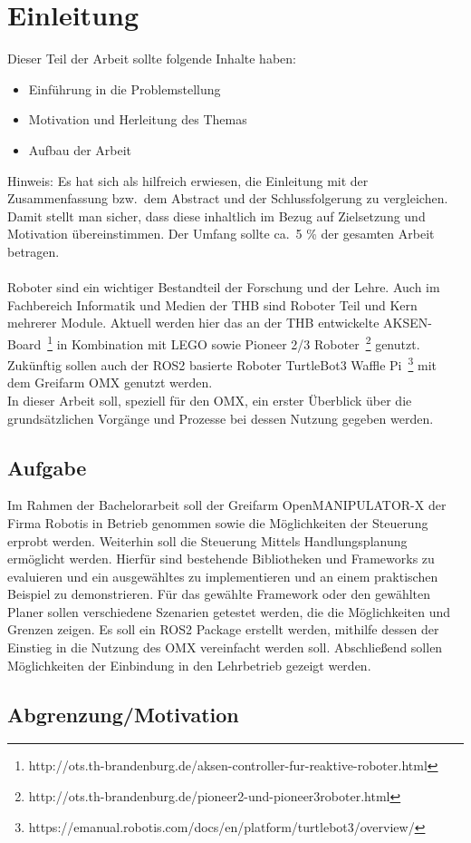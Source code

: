 \section{Einleitung} \label{einleitung}
Dieser Teil der Arbeit sollte folgende Inhalte haben:

\begin{itemize}
\item Einführung in die Problemstellung
\item Motivation und Herleitung des Themas
\item Aufbau der Arbeit
\end{itemize}

Hinweis:
Es hat sich als hilfreich erwiesen, die Einleitung mit der Zusammenfassung bzw.\ dem Abstract und der Schlussfolgerung zu vergleichen.
Damit stellt man sicher, dass diese inhaltlich im Bezug auf Zielsetzung und Motivation übereinstimmen.
Der Umfang sollte ca.\ 5 \% der gesamten Arbeit betragen.
\\
\\
Roboter sind ein wichtiger Bestandteil der Forschung und der Lehre.
Auch im Fachbereich Informatik und Medien der \ac{THB} sind Roboter Teil und Kern mehrerer Module.
Aktuell werden hier das an der \ac{THB} entwickelte AKSEN-Board~\footnote{http://ots.th-brandenburg.de/aksen-controller-fur-reaktive-roboter.html} in Kombination mit LEGO sowie Pioneer 2/3 Roboter~\footnote{http://ots.th-brandenburg.de/pioneer2-und-pioneer3roboter.html} genutzt.
Zukünftig sollen auch der \ac{ROS2} basierte Roboter TurtleBot3 Waffle Pi~\footnote{https://emanual.robotis.com/docs/en/platform/turtlebot3/overview/} mit dem Greifarm OMX genutzt werden.\\
In dieser Arbeit soll, speziell für den OMX, ein erster Überblick über die grundsätzlichen Vorgänge und Prozesse bei dessen Nutzung gegeben werden.

\subsection{Aufgabe}
Im Rahmen der Bachelorarbeit soll der Greifarm OpenMANIPULATOR-X der Firma Robotis in Betrieb genommen sowie die Möglichkeiten der Steuerung erprobt werden.
Weiterhin soll die Steuerung Mittels Handlungsplanung ermöglicht werden.
Hierfür sind bestehende Bibliotheken und Frameworks zu evaluieren und ein ausgewähltes zu implementieren und an einem praktischen Beispiel zu demonstrieren.
Für das gewählte Framework oder den gewählten Planer sollen verschiedene Szenarien getestet werden, die die Möglichkeiten und Grenzen zeigen.
Es soll ein ROS2 Package erstellt werden, mithilfe dessen der Einstieg in die Nutzung des OMX vereinfacht werden soll.
Abschließend sollen Möglichkeiten der Einbindung in den Lehrbetrieb gezeigt werden.
\subsection{Abgrenzung/Motivation}

